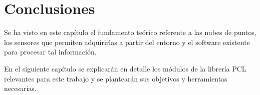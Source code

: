 \section{Conclusiones}
Se ha visto en este capítulo el fundamento teórico referente a las nubes de puntos, los sensores que permiten adquirirlas a partir del entorno y el software existente para procesar tal información.

En el siguiente capítulo se explicarán en detalle los módulos de la librería PCL relevantes para este trabajo y se plantearán sus objetivos y herramientas necesarias.






